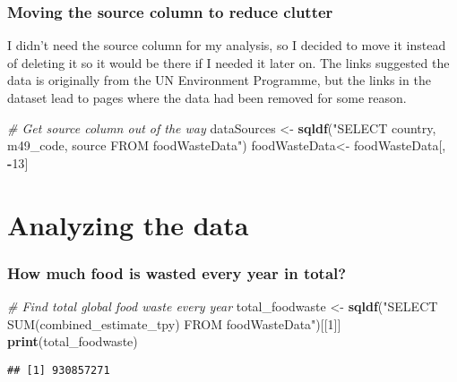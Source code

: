 \documentclass[
]{article}
\newenvironment{Shaded}{\begin{snugshade}}{\end{snugshade}}
\newcommand{\CommentTok}[1]{\textcolor[rgb]{0.56,0.35,0.01}{\textit{#1}}}
\newcommand{\DecValTok}[1]{\textcolor[rgb]{0.00,0.00,0.81}{#1}}
\newcommand{\FunctionTok}[1]{\textcolor[rgb]{0.13,0.29,0.53}{\textbf{#1}}}
\newcommand{\NormalTok}[1]{#1}
\newcommand{\OtherTok}[1]{\textcolor[rgb]{0.56,0.35,0.01}{#1}}
\newcommand{\SpecialCharTok}[1]{\textcolor[rgb]{0.81,0.36,0.00}{\textbf{#1}}}
\newcommand{\StringTok}[1]{\textcolor[rgb]{0.31,0.60,0.02}{#1}}
\begin{document}
\hypertarget{moving-the-source-column-to-reduce-clutter}{%
\subsubsection{Moving the source column to reduce
clutter}\label{moving-the-source-column-to-reduce-clutter}}

I didn't need the source column for my analysis, so I decided to move it
instead of deleting it so it would be there if I needed it later on. The
links suggested the data is originally from the UN Environment
Programme, but the links in the dataset lead to pages where the data had
been removed for some reason.

\begin{Shaded}
\begin{Highlighting}[]
\CommentTok{\# Get source column out of the way}
\NormalTok{dataSources }\OtherTok{\textless{}{-}} \FunctionTok{sqldf}\NormalTok{(}\StringTok{"SELECT country, m49\_code, source FROM foodWasteData"}\NormalTok{)}
\NormalTok{foodWasteData}\OtherTok{\textless{}{-}}\NormalTok{ foodWasteData[, }\SpecialCharTok{{-}}\DecValTok{13}\NormalTok{]}
\end{Highlighting}
\end{Shaded}

\hypertarget{analyzing-the-data}{%
\section{Analyzing the data 🔬}\label{analyzing-the-data}}

\hypertarget{how-much-food-is-wasted-every-year-in-total}{%
\subsubsection{How much food is wasted every year in
total?}\label{how-much-food-is-wasted-every-year-in-total}}

\begin{Shaded}
\begin{Highlighting}[]
\CommentTok{\# Find total global food waste every year}
\NormalTok{total\_foodwaste }\OtherTok{\textless{}{-}} \FunctionTok{sqldf}\NormalTok{(}\StringTok{"SELECT SUM(combined\_estimate\_tpy) FROM foodWasteData"}\NormalTok{)[[}\DecValTok{1}\NormalTok{]]}
\FunctionTok{print}\NormalTok{(total\_foodwaste)}
\end{Highlighting}
\end{Shaded}

\begin{verbatim}
## [1] 930857271
\end{verbatim}
\end{document}

